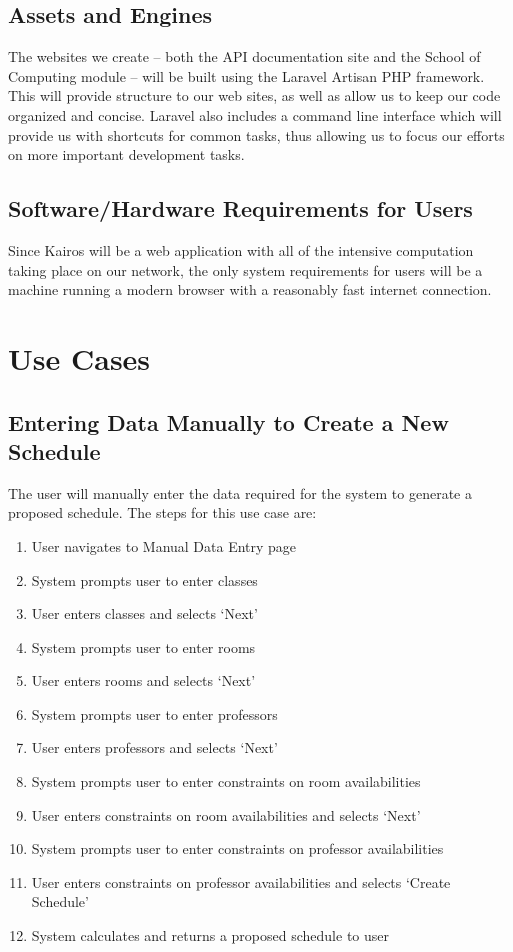 \documentclass{extarticle}
\begin{document}
\subsection{Assets and Engines}
The websites we create -- both the API documentation site and the School of Computing module -- will be built using
the Laravel Artisan PHP framework.  This will provide structure to our web sites, as well as allow us to keep our
code organized and concise.  Laravel also includes a command line interface which will provide us with shortcuts
for common tasks, thus allowing us to focus our efforts on more important development tasks.

\subsection{Software/Hardware Requirements for Users}
Since Kairos will be a web application with all of the intensive computation taking place on our network, the only
system requirements for users will be a machine running a modern browser with a reasonably fast internet connection.

\newpage

\appendix
\section{Use Cases}

\subsection{Entering Data Manually to Create a New Schedule}
The user will manually enter the data required for the system to generate a proposed schedule.  The steps for this
use case are:

\begin{enumerate}
\item User navigates to Manual Data Entry page
\item System prompts user to enter classes
\item User enters classes and selects `Next'
\item System prompts user to enter rooms
\item User enters rooms and selects `Next'
\item System prompts user to enter professors
\item User enters professors and selects `Next'
\item System prompts user to enter constraints on room availabilities
\item User enters constraints on room availabilities and selects `Next'
\item System prompts user to enter constraints on professor availabilities
\item User enters constraints on professor availabilities and selects `Create Schedule'
\item System calculates and returns a proposed schedule to user
\end{enumerate}
\end{document}
